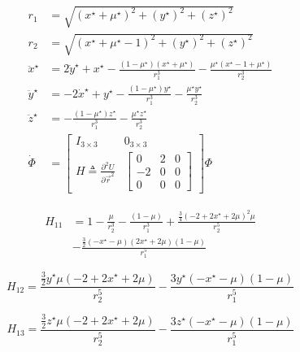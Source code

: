 \documentclass[conf]{new-aiaa}
\begin{document}
\begin{multicols*}{2}
\begin{align}
    r_1 & = \sqrt{(x^\star+\mu^\star)^2 + (y^\star)^2 + (z^\star)^2} \\
    r_2 & = \sqrt{(x^\star+\mu^\star-1)^2 + (y^\star)^2 + (z^\star)^2} \\
    \ddot{x}^\star & = 2\dot{y}^\star + x^\star - \frac{(1-\mu^\star)(x^\star + \mu^\star)}{r_1^3} - 
        \frac{\mu^\star (x^\star - 1 + \mu^\star)}{r_2^3} \\
    \ddot{y}^\star & = -2\dot{x}^\star + y^\star - \frac{(1 - \mu^\star)y^\star}{r_1^3} - \frac{\mu^\star y^\star}{r_2^3} \\
    \ddot{z}^\star & = -\frac{(1-\mu^\star)z^\star}{r_1^3} - \frac{\mu^\star z^\star}{r_2^3} \\
    \dot{\Phi} & = \begin{bmatrix} I_{3 \times 3} & 0_{3 \times 3} \\ H \triangleq \frac{\partial^2 U}{\partial \overrightarrow{r}^2} & \begin{bmatrix} 0 & 2 & 0 \\ -2 & 0 & 0 \\ 0 & 0 & 0 \end{bmatrix} \end{bmatrix} \Phi
\end{align}

\begin{equation}
    \begin{aligned}
        H_{11} &= 1 - \frac{\mu}{r_2^{3}} - \frac{\left( 1 - \mu \right)}{r_1^{3}} + \frac{\frac{3}{4} \left( -2 + 2 x^{\star} + 2 \mu \right)^{2} \mu}{r_2^{5}} \\
        &- \frac{\frac{3}{2} \left(  - x^{\star} - \mu \right) \left( 2 x^{\star} + 2 \mu \right) \left( 1 - \mu \right)}{r_1^{5}}
    \end{aligned}
  \end{equation}

    
\begin{equation}
    H_{12} = \frac{\frac{3}{2} y^{\star} \mu \left( -2 + 2 x^{\star} + 2 \mu \right)}{r_2^{5}} - \frac{3 y^{\star} \left(  - x^{\star} - \mu \right) \left( 1 - \mu \right)}{r_1^{5}}
\end{equation}
    
    
\begin{equation}
    H_{13} =\frac{\frac{3}{2} z^{\star} \mu \left( -2 + 2 x^{\star} + 2 \mu \right)}{r_2^{5}} - \frac{3 z^{\star} \left(  - x^{\star} - \mu \right) \left( 1 - \mu \right)}{r_1^{5}}
\end{equation}
    

\end{multicols*}
\end{document}

